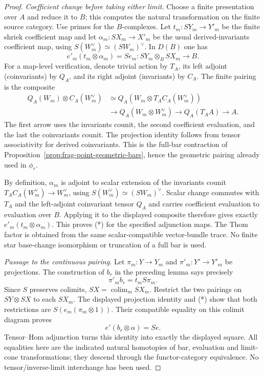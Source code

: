 \documentclass[11pt]{article}
\theoremstyle{definition}
\theoremstyle{remark}
\begin{document}
\begin{proof}
\emph{Coefficient change before taking either limit.}
Choose a finite presentation over $A$ and reduce it to $B$; this
computes the natural transformation on the finite source category.
Use primes for the $B$-complexes.  Let $t_m:SY_m\to Y'_m$ be the
finite shriek coefficient map and let $\alpha_m:SX_m\to X'_m$ be
the usual derived-invariants coefficient map, using
$S(W_m^\vee)\simeq(SW_m)^\vee$.  In $D(B)$ one has
\[
 e'_m(t_m\otimes\alpha_m)=S e_m:
                SY_m\otimes_B SX_m\longrightarrow B.
\tag{*}
\]
For a map-level verification, denote trivial action by $T_A$, its
left adjoint (coinvariants) by $Q_A$, and its right adjoint
(invariants) by $C_A$.  The finite pairing is the composite
\[
\begin{aligned}
 Q_A(W_m)\otimes C_A(W_m^\vee)
 &\simeq Q_A(W_m\otimes T_A C_A(W_m^\vee))\\
 &\longrightarrow Q_A(W_m\otimes W_m^\vee)
 \longrightarrow Q_A(T_AA)\longrightarrow A.
\end{aligned}
\]
The first arrow uses the invariants counit, the second coefficient
evaluation, and the last the coinvariants counit.  The projection
identity follows from tensor associativity for derived coinvariants.
This is the full-bar contraction of
Proposition~\ref{prop:frag-point-geometric-bars}, hence the geometric
pairing already used in $\phi_r$.

By definition, $\alpha_m$ is adjoint to scalar extension of the
invariants counit
$T_A C_A(W_m^\vee)\to W_m^\vee$, using
$S(W_m^\vee)\simeq(SW_m)^\vee$.  Scalar change commutes with
$T_A$ and the left-adjoint coinvariant tensor $Q_A$ and carries
coefficient evaluation to evaluation over $B$.  Applying it to
the displayed composite therefore gives exactly
$e'_m(t_m\otimes\alpha_m)$.  This proves (*) for the specified
adjunction maps.
The Thom factor is obtained from the same scalar-compatible
vector-bundle trace.  No finite star base-change isomorphism or
truncation of a full bar is used.

\emph{Passage to the continuous pairing.}
Let $\pi_m:Y\to Y_m$ and $\pi'_m:Y'\to Y'_m$ be projections.
The construction of $b_r$ in the preceding lemma says precisely
\[
 \pi'_m b_r=t_m S\pi_m.
\]
Since $S$ preserves colimits, $SX=\operatorname*{colim}_mSX_m$.
Restrict the two pairings on $SY\otimes SX$ to each $SX_m$.
The displayed projection identity and (*) show that both restrictions
are $S(e_m(\pi_m\otimes1))$.  Their compatible equality on this
colimit diagram proves
\[
 e'(b_r\otimes\alpha)=S e.
\]
Tensor--Hom adjunction turns this identity into exactly the displayed
square.  All equalities here are the indicated natural homotopies of
bar, evaluation and limit-cone transformations; they descend through
the functor-category equivalence.  No tensor/inverse-limit interchange
has been used.


\end{proof}
\end{document}
